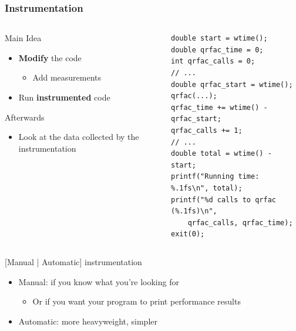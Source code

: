\documentclass[xcolor={x11names,svgnames}]{beamer}
\begin{document}
\begin{frame}[fragile]
  \frametitle{Instrumentation}
  
  \begin{columns}
    \begin{column}{5cm}
  \begin{block}{Main Idea}
    \begin{itemize}
    \item \textbf{Modify} the code
      \begin{itemize}
      \item Add measurements
      \end{itemize}
    \item Run \textbf{instrumented} code
    \end{itemize}    
  \end{block}

  \begin{exampleblock}{Afterwards}
    \begin{itemize}
    \item Look at the data collected by the instrumentation
    \end{itemize}
  \end{exampleblock}
  
\end{column}
\begin{column}{6cm}
  \begin{verbatim}
double start = wtime();
double qrfac_time = 0;
int qrfac_calls = 0;
// ...
double qrfac_start = wtime();
qrfac(...);
qrfac_time += wtime() - qrfac_start;
qrfac_calls += 1;
// ...
double total = wtime() - start;
printf("Running time: %.1fs\n", total);
printf("%d calls to qrfac (%.1fs)\n",
    qrfac_calls, qrfac_time);
exit(0);
  \end{verbatim}
\end{column}
\end{columns}

\bigskip

\begin{alertblock}{[Manual | Automatic] instrumentation}
  \begin{itemize}
  \item Manual: if you know what you're looking for
    \begin{itemize}
    \item Or if you want your program to print performance results
    \end{itemize}
  \item Automatic: more heavyweight, simpler
  \end{itemize}
\end{alertblock}
\end{frame}
\end{document}

